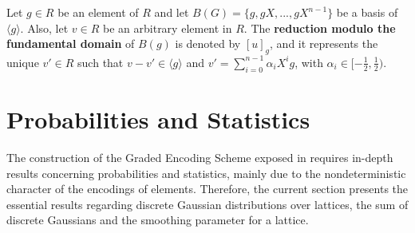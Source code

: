 Let $g \in R$ be an element of $R$ and let $B(G) = \{g, gX, ..., gX^{n-1}\}$ be a basis of $\langle g \rangle$. Also, let $v \in R$ be an arbitrary element in $R$. The \textbf{reduction modulo the fundamental domain} of  $B(g)$ is denoted by $[u]_g$, and it represents the unique $v' \in R$ such that $v - v' \in \langle g \rangle$ and $v' = \displaystyle{\sum_{i = 0}^{n-1}} \alpha_iX^ig$, with $\alpha_i \in [-\frac{1}{2}, \frac{1}{2})$.

\section{Probabilities and Statistics}

The construction of the Graded Encoding Scheme exposed in \cite{GGH13} requires in-depth results concerning probabilities and statistics, mainly due to the nondeterministic character of the encodings of elements. Therefore, the current section presents the essential results regarding discrete Gaussian distributions over lattices, the sum of discrete Gaussians and the smoothing parameter for a lattice.\\

